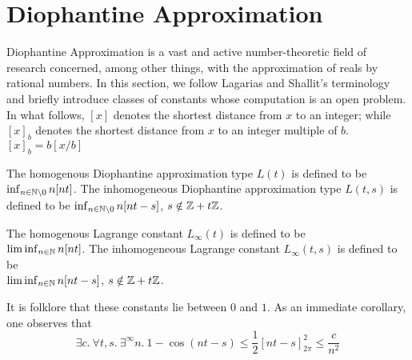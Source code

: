 \section{Diophantine Approximation}
\label{section:diophantine}

Diophantine Approximation is a vast and active number-theoretic field of research concerned, among other things, with the approximation of reals by rational numbers. In this section, we follow Lagarias and Shallit’s terminology \cite{dio-constants} and briefly introduce classes of constants whose computation is an open problem. In what follows, $[x]$ denotes the shortest distance from $x$ to an integer; while $[x]_b$ denotes the shortest distance from $x$ to an integer multiple of $b$. $[x]_b = b[x/b]$

\begin{definition}
\label{def:L}
The homogenous Diophantine approximation type $L(t)$ is defined to be $\inf_{n \in \mathbb{N} \backslash{0}} n[nt]$. The inhomogeneous Diophantine approximation type $L(t, s)$ is defined to be $\inf_{n \in \mathbb{N} \backslash{0}} n[nt - s]$, $s \notin \mathbb{Z} + t\mathbb{Z}$. 
\end{definition} 

\begin{definition}
\label{def:Linfty}
The homogenous Lagrange constant $L_\infty(t)$ is defined to be \\ $\liminf_{n \in \mathbb{N}} n[nt]$. The inhomogeneous Lagrange constant $L_\infty(t, s)$ is defined to be\\ $\liminf_{n \in \mathbb{N}} n[nt - s]$, $s \notin \mathbb{Z} + t\mathbb{Z}$.
\end{definition} 

It is folklore that these constants lie between $0$ and $1$. As an immediate corollary, one observes that
\begin{equation}
\label{eq:quadraticdecay}
\exists c.~\forall t, s.~ \exists^\infty n. ~ 1 - \cos(nt - s) \le \frac{1}{2}\left[nt-s\right]_{2\pi}^2 \le \frac{c}{n^2}
\end{equation}

